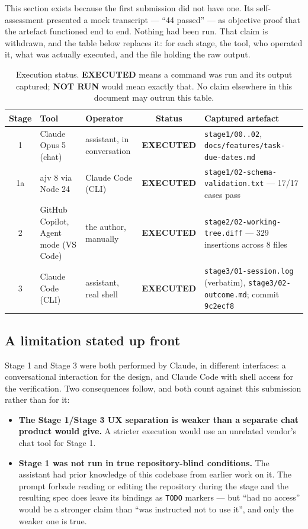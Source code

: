 \documentclass[11pt,a4paper]{article}
\newcommand{\code}[1]{\texttt{\small #1}}
\newcommand{\ran}{\textcolor{good}{\textbf{EXECUTED}}}
\newcommand{\notran}{\textcolor{bad}{\textbf{NOT RUN}}}
\begin{document}
This section exists because the first submission did not have one. Its
self-assessment presented a mock transcript --- ``44 passed'' --- as objective
proof that the artefact functioned end to end. Nothing had been run. That claim
is withdrawn, and the table below replaces it: for each stage, the tool, who
operated it, what was actually executed, and the file holding the raw output.

\begin{table}[h]
\centering
\small
\begin{tabularx}{\textwidth}{@{}c l l c X@{}}
\toprule
\textbf{Stage} & \textbf{Tool} & \textbf{Operator} & \textbf{Status} & \textbf{Captured artefact} \\
\midrule
1 & Claude Opus 5 (chat) & assistant, in conversation & \ran &
  \code{stage1/00..02}, \code{docs/features/\allowbreak task-due-dates.md} \\
1a & ajv 8 via Node 24 & Claude Code (CLI) & \ran &
  \code{stage1/02-schema-\allowbreak validation.txt} --- 17/17 cases pass \\
2 & GitHub Copilot, Agent mode (VS Code) & the author, manually & \ran &
  \code{stage2/02-working-\allowbreak tree.diff} --- 329 insertions across 8 files \\
3 & Claude Code (CLI) & assistant, real shell & \ran &
  \code{stage3/01-session.log} (verbatim), \code{stage3/02-outcome.md};
  commit \code{9c2ecf8} \\
\bottomrule
\end{tabularx}
\caption{Execution status. \ran{} means a command was run and its output
captured; \notran{} would mean exactly that. No claim elsewhere in this
document may outrun this table.}
\end{table}

\subsection{A limitation stated up front}

Stage 1 and Stage 3 were both performed by Claude, in different interfaces: a
conversational interaction for the design, and Claude Code with shell access
for the verification. Two consequences follow, and both count against this
submission rather than for it:

\begin{itemize}
  \item \textbf{The Stage 1/Stage 3 UX separation is weaker than a separate
        chat product would give.} A stricter execution would use an unrelated
        vendor's chat tool for Stage 1.
  \item \textbf{Stage 1 was not run in true repository-blind conditions.} The
        assistant had prior knowledge of this codebase from earlier work on it.
        The prompt forbade reading or editing the repository during the stage
        and the resulting spec does leave its bindings as \code{TODO} markers
        --- but ``had no access'' would be a stronger claim than ``was
        instructed not to use it'', and only the weaker one is true.
\end{itemize}
\end{document}
